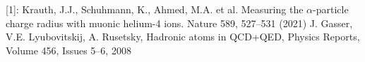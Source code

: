 \documentclass[preview]{standalone}
\begin{document}
\begin{center}
[1]: Krauth, J.J., Schuhmann, K., Ahmed, M.A. et al. Measuring the $\alpha$-particle charge radius with muonic helium-4 ions. Nature 589, 527–531 (2021)
J. Gasser, V.E. Lyubovitskij, A. Rusetsky, Hadronic atoms in QCD+QED, Physics Reports, Volume 456, Issues 5–6, 2008
\end{center}
\end{document}
